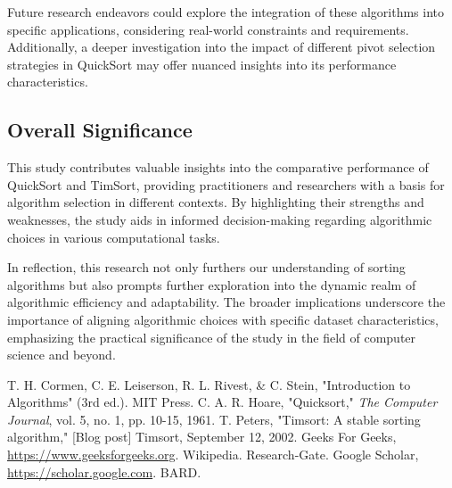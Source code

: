 \documentclass[a4paper, 9pt, twocolumn]{article}
\begin{document}
Future research endeavors could explore the integration of these algorithms into specific applications, considering real-world constraints and requirements. Additionally, a deeper investigation into the impact of different pivot selection strategies in QuickSort may offer nuanced insights into its performance characteristics.

\subsection*{Overall Significance}

This study contributes valuable insights into the comparative performance of QuickSort and TimSort, providing practitioners and researchers with a basis for algorithm selection in different contexts. By highlighting their strengths and weaknesses, the study aids in informed decision-making regarding algorithmic choices in various computational tasks.

In reflection, this research not only furthers our understanding of sorting algorithms but also prompts further exploration into the dynamic realm of algorithmic efficiency and adaptability. The broader implications underscore the importance of aligning algorithmic choices with specific dataset characteristics, emphasizing the practical significance of the study in the field of computer science and beyond.

% 
% 
\begin{thebibliography}{9}

  T. H. Cormen, C. E. Leiserson, R. L. Rivest, \& C. Stein, "Introduction to Algorithms" (3rd ed.). MIT Press.
  \label{cormen2009}
  C. A. R. Hoare, "Quicksort," \textit{The Computer Journal}, vol. 5, no. 1, pp. 10-15, 1961.
  \label{hoare1961}
  T. Peters, "Timsort: A stable sorting algorithm," [Blog post] Timsort, September 12, 2002.
  \label{peters2002}
  Geeks For Geeks, \url{https://www.geeksforgeeks.org}.
  \label{geeksforgeeks}
  Wikipedia.
  \label{wikipedia}
  Research-Gate.
  \label{researchgate}
  Google Scholar, \url{https://scholar.google.com}.
  \label{googlescholar}
  BARD.
  \label{bard}
\end{thebibliography}
\end{document}

